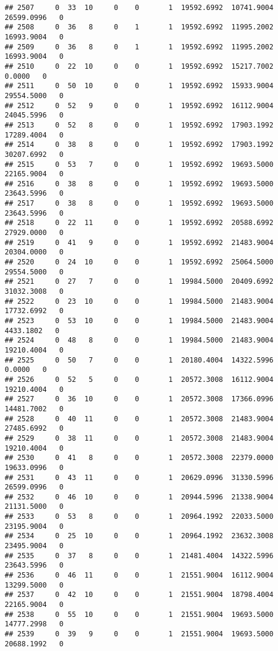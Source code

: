 \documentclass[
]{article}
\begin{document}
\begin{enumerate}
\begin{verbatim}
## 2507     0  33  10     0    0       1  19592.6992  10741.9004  26599.0996   0
## 2508     0  36   8     0    1       1  19592.6992  11995.2002  16993.9004   0
## 2509     0  36   8     0    1       1  19592.6992  11995.2002  16993.9004   0
## 2510     0  22  10     0    0       1  19592.6992  15217.7002      0.0000   0
## 2511     0  50  10     0    0       1  19592.6992  15933.9004  29554.5000   0
## 2512     0  52   9     0    0       1  19592.6992  16112.9004  24045.5996   0
## 2513     0  52   8     0    0       1  19592.6992  17903.1992  17289.4004   0
## 2514     0  38   8     0    0       1  19592.6992  17903.1992  30207.6992   0
## 2515     0  53   7     0    0       1  19592.6992  19693.5000  22165.9004   0
## 2516     0  38   8     0    0       1  19592.6992  19693.5000  23643.5996   0
## 2517     0  38   8     0    0       1  19592.6992  19693.5000  23643.5996   0
## 2518     0  22  11     0    0       1  19592.6992  20588.6992  27929.0000   0
## 2519     0  41   9     0    0       1  19592.6992  21483.9004  20304.0000   0
## 2520     0  24  10     0    0       1  19592.6992  25064.5000  29554.5000   0
## 2521     0  27   7     0    0       1  19984.5000  20409.6992  31032.3008   0
## 2522     0  23  10     0    0       1  19984.5000  21483.9004  17732.6992   0
## 2523     0  53  10     0    0       1  19984.5000  21483.9004   4433.1802   0
## 2524     0  48   8     0    0       1  19984.5000  21483.9004  19210.4004   0
## 2525     0  50   7     0    0       1  20180.4004  14322.5996      0.0000   0
## 2526     0  52   5     0    0       1  20572.3008  16112.9004  19210.4004   0
## 2527     0  36  10     0    0       1  20572.3008  17366.0996  14481.7002   0
## 2528     0  40  11     0    0       1  20572.3008  21483.9004  27485.6992   0
## 2529     0  38  11     0    0       1  20572.3008  21483.9004  19210.4004   0
## 2530     0  41   8     0    0       1  20572.3008  22379.0000  19633.0996   0
## 2531     0  43  11     0    0       1  20629.0996  31330.5996  26599.0996   0
## 2532     0  46  10     0    0       1  20944.5996  21338.9004  21131.5000   0
## 2533     0  53   8     0    0       1  20964.1992  22033.5000  23195.9004   0
## 2534     0  25  10     0    0       1  20964.1992  23632.3008  23495.9004   0
## 2535     0  37   8     0    0       1  21481.4004  14322.5996  23643.5996   0
## 2536     0  46  11     0    0       1  21551.9004  16112.9004  13299.5000   0
## 2537     0  42  10     0    0       1  21551.9004  18798.4004  22165.9004   0
## 2538     0  55  10     0    0       1  21551.9004  19693.5000  14777.2998   0
## 2539     0  39   9     0    0       1  21551.9004  19693.5000  20688.1992   0

\end{verbatim}
\end{enumerate}
\end{document}
